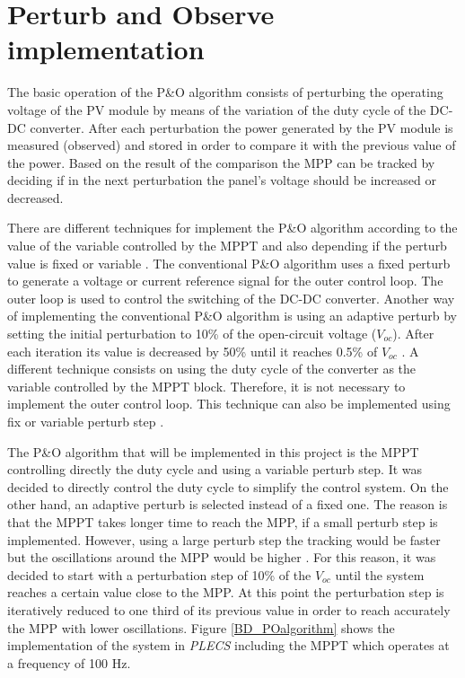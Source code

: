 \section{Perturb and Observe implementation}\label{MPPTImplementation}

The basic operation of the P\&O algorithm consists of perturbing the operating voltage of the PV module by means of the variation of the duty cycle of the DC-DC converter. After each perturbation the power generated by the PV module is measured (observed) and stored in order to compare it with the previous value of the power. Based on the result of the comparison the MPP can be tracked by deciding if in the next perturbation the panel's voltage should be increased or decreased.

There are different techniques for implement the P\&O algorithm according to the value of the variable controlled by the MPPT and also depending if the perturb value is fixed or variable \cite{implementationPandO}. The conventional P\&O algorithm uses a fixed perturb to generate a voltage or current reference signal for the outer control loop. The outer loop is used to control the switching of the DC-DC converter. Another way of implementing the conventional P\&O algorithm is using an adaptive perturb by setting the initial perturbation to 10\% of the open-circuit voltage ($V_{oc}$). After each iteration its value is decreased by 50\% until it reaches 0.5\%
of $V_{oc}$ \cite{implementationPandO}. A different technique consists on using the duty cycle of the converter as the variable controlled by the MPPT block. Therefore, it is not necessary to implement the outer control loop. This technique can also be implemented using fix or variable perturb step \cite{implementationPandO}. 

The P\&O algorithm that will be implemented in this project is the MPPT controlling directly the duty cycle and using a variable perturb step. It was decided to directly control the duty cycle to simplify the control system. On the other hand, an adaptive perturb is selected instead of a fixed one. The reason is that the MPPT takes longer time to reach the MPP, if a small perturb step is implemented. However, using a large perturb step the tracking would be faster but the oscillations around the MPP would be higher \cite{implementationPandO}. For this reason, it was decided to start with a perturbation step of 10\% of the $V_{oc}$ until the system reaches a certain value close to the MPP. At this point the perturbation step is iteratively reduced to one third of its previous value in order to reach accurately the MPP with lower oscillations. Figure \ref{BD_POalgorithm} shows the implementation of the system in \textit{PLECS} including the MPPT which operates at a frequency of 100 Hz. 

